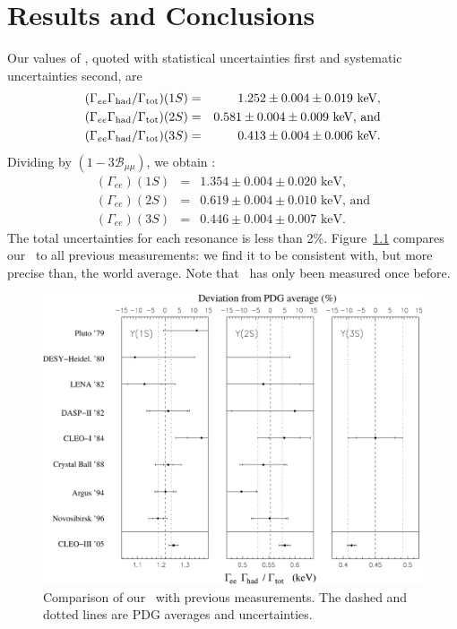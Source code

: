 \documentclass{cornell}
\begin{document}
\chapter{Results and Conclusions}
\label{chp:results}

Our values of \geehadtot, quoted with statistical uncertainties
first and systematic uncertainties second, are
\begin{eqnarray}
  (\Gamma_{ee}\Gamma_{\mbox{\scriptsize had}}/\Gamma_{\mbox{\scriptsize tot}})(1S) &=& 1.252 \pm 0.004 \pm 0.019 \mbox{ keV,} \\
  (\Gamma_{ee}\Gamma_{\mbox{\scriptsize had}}/\Gamma_{\mbox{\scriptsize tot}})(2S) &=& 0.581 \pm 0.004 \pm 0.009 \mbox{ keV, and} \\
  (\Gamma_{ee}\Gamma_{\mbox{\scriptsize had}}/\Gamma_{\mbox{\scriptsize tot}})(3S) &=& 0.413 \pm 0.004 \pm 0.006 \mbox{ keV.}
\end{eqnarray}
Dividing by $(1-3{\mathcal B}_{\mu\mu})$, we obtain \gee:
\begin{eqnarray}
  (\Gamma_{ee})(1S) &=& 1.354 \pm 0.004 \pm 0.020 \mbox{ keV,} \\
  (\Gamma_{ee})(2S) &=& 0.619 \pm 0.004 \pm 0.010 \mbox{ keV, and} \\
  (\Gamma_{ee})(3S) &=& 0.446 \pm 0.004 \pm 0.007 \mbox{ keV.}
\end{eqnarray}
The total uncertainties for each resonance is less than 2\%.  Figure~\ref{historyplot} compares our \geehadtot\ to all previous
measurements: we find it to be consistent with, but more precise than,
the world average.  Note that \usss\ has only been measured once
before.

\begin{figure}[p]
  \begin{center}
    \includegraphics[height=\linewidth, angle=90]{plots/historyplot}
  \end{center}
  \caption{\label{historyplot} Comparison of our \geehadtot\ with
  previous measurements.  The dashed and dotted lines are PDG averages
  and uncertainties.}
\end{figure}
\end{document}
